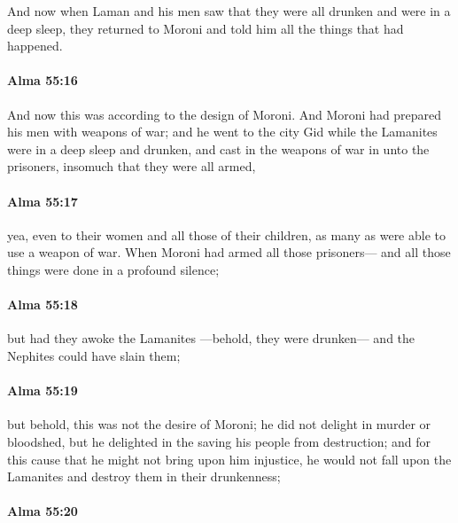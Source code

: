 			And now when Laman and his men saw
			that they were all drunken and were in a deep sleep,
			they returned to Moroni and told him all the things that had happened.

		\paragraph{Alma 55:16} %
			\label{ALMA-55-16}

			And now this was according to the design of Moroni.
			And Moroni had prepared his men with weapons of war;
			and he went to the city Gid
			while the Lamanites were in a deep sleep and drunken,
			and cast in the weapons of war in unto the prisoners,
			insomuch that they were all armed,

		\paragraph{Alma 55:17} %
			\label{ALMA-55-17}

			yea, even to their women and all those of their children,
			as many as were able to use a weapon of war.
			When Moroni had armed all those prisoners---
			and all those things were done in a profound silence;

		\paragraph{Alma 55:18} %
			\label{ALMA-55-18}

			but had they awoke the Lamanites
			---behold, they were drunken---
			and the Nephites could have slain them;

		\paragraph{Alma 55:19} %
			\label{ALMA-55-19}

			but behold, this was not the desire of Moroni;
			he did not delight in murder or bloodshed,
			but he delighted in the saving his people from destruction;
			and for this cause that he might not bring upon him injustice,
			he would not fall upon the Lamanites and destroy them in their drunkenness;

		\paragraph{Alma 55:20} %
			\label{ALMA-55-20}

